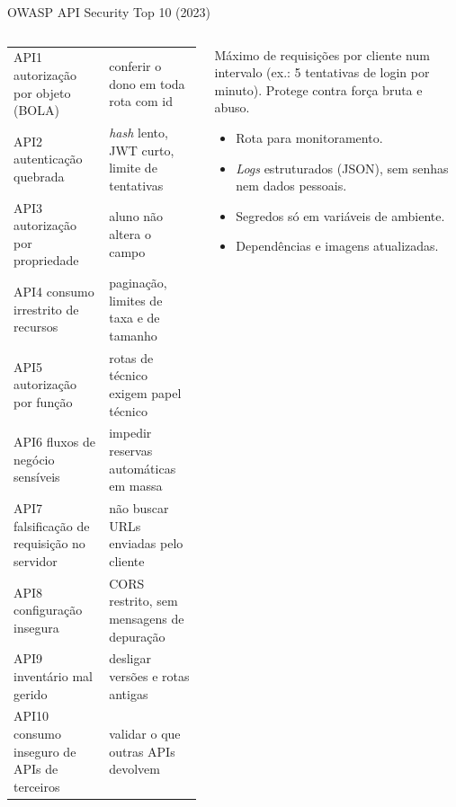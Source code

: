\documentclass[aspectratio=169,10pt]{beamer}
\begin{document}
\begin{frame}{OWASP API Security Top 10 (2023)}
  \begin{columns}[T]
    \begin{column}{0.56\textwidth}
      \scriptsize
      \begin{tabularx}{\linewidth}{@{}p{3.6cm} L@{}}
        \toprule
         &  \\
        \midrule
        API1 autorização por objeto (BOLA) & conferir o dono em toda rota com id \\
        API2 autenticação quebrada & \emph{hash} lento, JWT curto, limite de tentativas \\
        API3 autorização por propriedade & aluno não altera o campo  \\
        API4 consumo irrestrito de recursos & paginação, limites de taxa e de tamanho \\
        API5 autorização por função & rotas de técnico exigem papel técnico \\
        API6 fluxos de negócio sensíveis & impedir reservas automáticas em massa \\
        API7 falsificação de requisição no servidor & não buscar URLs enviadas pelo cliente \\
        API8 configuração insegura & CORS restrito, sem mensagens de depuração \\
        API9 inventário mal gerido & desligar versões e rotas antigas \\
        API10 consumo inseguro de APIs de terceiros & validar o que outras APIs devolvem \\
        \bottomrule
      \end{tabularx}
    \end{column}
    \begin{column}{0.42\textwidth}
      \begin{definicao}
        Máximo de requisições por cliente num intervalo (ex.: 5 tentativas de login por minuto). Protege contra força bruta e abuso.
      \end{definicao}
      \begin{conceito}[Operação]
        \begin{itemize}
          \item Rota  para monitoramento.
          \item \emph{Logs} estruturados (JSON), sem senhas nem dados pessoais.
          \item Segredos só em variáveis de ambiente.
          \item Dependências e imagens atualizadas.
        \end{itemize}
      \end{conceito}
    \end{column}
  \end{columns}
\end{frame}
\end{document}
